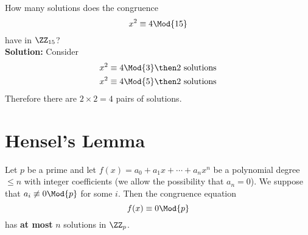 \documentclass[12pt, a4paper]{article}
\begin{document}
\begin{example}
    How many solutions does the congruence
    \[x^2 \equiv 4 \Mod{15}\]
    have in \(\ZZ_{15}\)? \\
    \textbf{Solution:} Consider 
    \[\begin{aligned}
        x^2 &\equiv 4 \Mod{3} \then \text{2 solutions} \\ 
        x^2 &\equiv 4 \Mod{5} \then \text{2 solutions}
    \end{aligned}\]
    Therefore there are \(2\times 2=4\) pairs of solutions.
\end{example}

\section{Hensel's Lemma}

\begin{theorem}
    Let \(p\) be a prime and let \(f(x)=a_0+a_1x+\cdots +a_nx^n\) be a polynomial degree \(\leq n\) with integer coefficients (we allow the possibility that \(a_n=0\)). We suppose that \(a_i \not\equiv 0 \Mod{p}\) for some \(i\). Then the congruence equation 
    \[f(x) \equiv 0 \Mod{p}\]
    has \textbf{at most} \(n\) solutions in \(\ZZ_p\).
\end{theorem}

\end{document}
